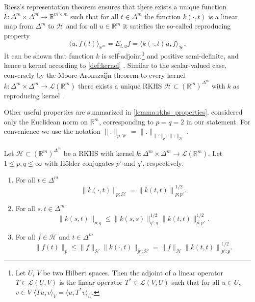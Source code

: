 \documentclass{article}
\begin{document}
Riesz's representation theorem ensures that there exists a unique function
$k \colon \Delta^m \times \Delta^m \to \mathbb{R}^{m \times m}$ such that for
all $t \in \Delta^m$ the function $k(\cdot, t)$ is a linear map from $\Delta^m$
to $\mathcal{H}$ and for all $u \in \mathbb{R}^m$ it satisfies the so-called
reproducing property
\begin{equation}\label{eq:reproducing_property}
  \langle u, f(t) \rangle_{\mathbb{R}^m} = E_{t,u}f = \langle k(\cdot, t) u, f\rangle_{\mathcal{H}}.
\end{equation}
It can be shown that function $k$ is self-adjoint\footnote{Let $U$, $V$ be two
  Hilbert spaces. Then the adjoint of a linear operator
  $T \in \mathcal{L}(U, V)$ is the linear operator $T^* \in \mathcal{L}(V, U)$
  such that for all $u \in U$, $v \in V$
  $\langle Tu, v\rangle_{V} = \langle u, T^*v \rangle_U$.} and positive
semi-definite, and hence a kernel according to \cref{def:kernel}
\citep[Proposition~1]{micchelli05_learn_vector_valued_funct}. Similar to the
scalar-valued case, conversely by the Moore-Aronszaijn theorem
\citep{aronszajn50_theor_reprod_kernel} to every kernel
$k \colon \Delta^m \times \Delta^m \to \mathcal{L}(\mathbb{R}^m)$ there exists a
unique RKHS $\mathcal{H} \subset {(\mathbb{R}^m)}^{\Delta^m}$ with $k$ as
reproducing kernel \citep[][Theorem~1]{micchelli05_learn_vector_valued_funct}.

Other useful properties are summarized in \cref{lemma:rkhs_properties}.
 considered only the Euclidean norm
on $\mathbb{R}^m$, corresponding to $p = q = 2$ in our statement. For
convenience we use the notation
$\|.\|_{p; \mathcal{H}} = \|.\|_{\|.\|_p; \|.\|_{\mathcal{H}}}$.

\begin{lemma}\label{lemma:rkhs_properties}
  Let $\mathcal{H} \subset {(\mathbb{R}^m)}^{\Delta^m}$ be a RKHS with kernel
  $k \colon \Delta^m \times \Delta^m \to \mathcal{L}(\mathbb{R}^m)$. Let
  $1\leq p, q \leq \infty$ with Hölder conjugates $p'$ and $q'$, respectively.

  \begin{enumerate}
  \item For all $t \in \Delta^m$
    \begin{equation}\label{eq:rkhs_kernel}
      \|k(\cdot, t)\|_{p;\mathcal{H}} = {\|k(t,t)\|}^{1/2}_{p;p'}.
    \end{equation}
  \item For all $s, t \in \Delta^m$
    \begin{equation}\label{eq:rkhs_st_bound}
      \|k(s,t)\|_{p;q} \leq \|k(s,s)\|_{q';q}^{1/2} \|k(t,t)\|_{p;p'}^{1/2}.
    \end{equation}
  \item For all $f \in \mathcal{H}$ and $t \in \Delta^m$
    \begin{equation}\label{eq:rkhs_bound}
      \|f(t)\|_p \leq \|f\|_{\mathcal{H}} \|k(\cdot, t)\|_{p';\mathcal{H}} = \|f\|_{\mathcal{H}} {\|k(t,t)\|}^{1/2}_{p';p}.
    \end{equation}
  \end{enumerate}
\end{lemma}
\end{document}
